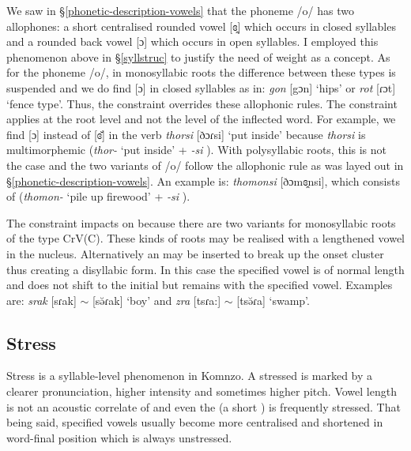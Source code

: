 We saw in \S{}\ref{phonetic-description-vowels} that the phoneme /o/ has two allophones: a short centralised rounded vowel [ɞ̯] which occurs in closed syllables and a rounded back vowel [ɔ] which occurs in open syllables. I employed this phenomenon above in \S{}\ref{syllstruc} to justify the need of  weight as a concept. As for the phoneme /o/, in monosyllabic roots the difference between these  types is suspended and we do find [ɔ] in closed syllables as in: \emph{gon} [gɔn] `hips' or \emph{rot} [ɾɔt] `fence type'. Thus, the  constraint overrides these allophonic rules. The constraint applies at the root level and not the level of the inflected word. For example, we find [ɔ] instead of [ɞ̆] in the verb \emph{thorsi} [ðɔɾsi] `put inside' because \emph{thorsi} is multimorphemic (\emph{thor-} `put inside' + \emph{-si} \Nmlz{}). With polysyllabic roots, this is not the case and the two variants of /o/ follow the allophonic rule as was layed out in \S{}\ref{phonetic-description-vowels}. An example is: \emph{thomonsi} [ðɔmɞ̯nsi], which consists of (\emph{thomon-} `pile up firewood' + \emph{-si} \Nmlz{}).%

The  constraint impacts on  because there are two variants for monosyllabic roots of the type CrV(C). These kinds of roots may be realised with a lengthened vowel in the nucleus. Alternatively an  may be inserted to break up the onset cluster thus creating a disyllabic form. In this case the specified vowel is of normal length and  does not shift to the initial  but remains with the specified vowel. Examples are: \emph{srak} [sɾak] $\sim$ [sə̆ɾak] `boy' and \emph{zra} [tsɾa:] $\sim$ [tsə̆ɾa] `swamp'.

\subsection{Stress} \label{stress}

Stress is a syllable-level phenomenon in Komnzo. A stressed  is marked by a clearer pronunciation, higher intensity and sometimes higher pitch. Vowel length is not an acoustic correlate of  and even the  (a short ) is frequently stressed. That being said, specified vowels usually become more centralised and shortened in word-final position which is always unstressed.%

